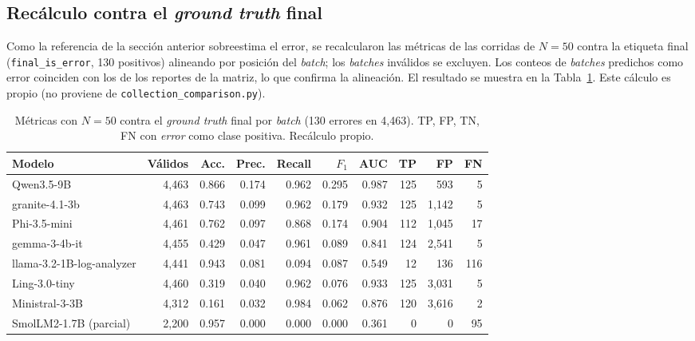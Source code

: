 \subsection{Recálculo contra el \textit{ground truth} final}\label{subsec:res_gtfinal}

Como la referencia de la sección anterior sobreestima el error, se recalcularon las métricas de las corridas de $N=50$ contra la etiqueta final (\texttt{final\_is\_error}, 130 positivos) alineando por posición del \textit{batch}; los \textit{batches} inválidos se excluyen. Los conteos de \textit{batches} predichos como error coinciden con los de los reportes de la matriz, lo que confirma la alineación. El resultado se muestra en la Tabla~\ref{tab:res_n50_final}. Este cálculo es propio (no proviene de \texttt{collection\_comparison.py}).

\begin{table}[H]
\centering
\caption{Métricas con $N=50$ contra el \textit{ground truth} final por \textit{batch} (130 errores en 4{,}463). TP, FP, TN, FN con \textit{error} como clase positiva. Recálculo propio.}
\label{tab:res_n50_final}
\small
\begin{tabular}{@{}lrrrrrrrrr@{}}
\toprule
\textbf{Modelo} & \textbf{Válidos} & \textbf{Acc.} & \textbf{Prec.} & \textbf{Recall} & \textbf{$F_1$} & \textbf{AUC} & \textbf{TP} & \textbf{FP} & \textbf{FN} \\
\midrule
Qwen3.5-9B & 4{,}463 & 0.866 & 0.174 & 0.962 & 0.295 & 0.987 & 125 & 593 & 5 \\
granite-4.1-3b & 4{,}463 & 0.743 & 0.099 & 0.962 & 0.179 & 0.932 & 125 & 1{,}142 & 5 \\
Phi-3.5-mini & 4{,}461 & 0.762 & 0.097 & 0.868 & 0.174 & 0.904 & 112 & 1{,}045 & 17 \\
gemma-3-4b-it & 4{,}455 & 0.429 & 0.047 & 0.961 & 0.089 & 0.841 & 124 & 2{,}541 & 5 \\
llama-3.2-1B-log-analyzer & 4{,}441 & 0.943 & 0.081 & 0.094 & 0.087 & 0.549 & 12 & 136 & 116 \\
Ling-3.0-tiny & 4{,}460 & 0.319 & 0.040 & 0.962 & 0.076 & 0.933 & 125 & 3{,}031 & 5 \\
Ministral-3-3B & 4{,}312 & 0.161 & 0.032 & 0.984 & 0.062 & 0.876 & 120 & 3{,}616 & 2 \\
SmolLM2-1.7B (parcial) & 2{,}200 & 0.957 & 0.000 & 0.000 & 0.000 & 0.361 & 0 & 0 & 95 \\
\bottomrule
\end{tabular}
\normalsize
\end{table}

